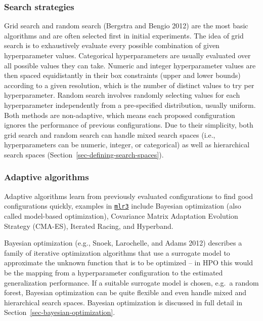 \hypertarget{search-strategies}{%
\subsubsection*{Search strategies}\label{search-strategies}}

Grid search and random search (Bergstra and Bengio 2012) are the most
basic algorithms and are often selected first in initial experiments.
The idea of grid search is to exhaustively evaluate every possible
combination of given hyperparameter values. Categorical hyperparameters
are usually evaluated over all possible values they can take. Numeric
and integer hyperparameter values are then spaced equidistantly in their
box constraints (upper and lower bounds) according to a given
resolution, which is the number of distinct values to try per
hyperparameter. Random search involves randomly selecting values for
each hyperparameter independently from a pre-specified distribution,
usually uniform. Both methods are non-adaptive, which means each
proposed configuration ignores the performance of previous
configurations. Due to their simplicity, both grid search and random
search can handle mixed search spaces (i.e., hyperparameters can be
numeric, integer, or categorical) as well as hierarchical search spaces
(Section~\ref{sec-defining-search-spaces}).

\hypertarget{adaptive-algorithms}{%
\subsubsection*{Adaptive algorithms}\label{adaptive-algorithms}}

Adaptive algorithms learn from previously evaluated configurations to
find good configurations quickly, examples in
\href{https://mlr3.mlr-org.com}{\texttt{mlr3}}
include Bayesian optimization (also called model-based optimization),
Covariance Matrix Adaptation Evolution Strategy (CMA-ES), Iterated
Racing, and Hyperband.

Bayesian optimization (e.g., Snoek,
Larochelle, and Adams 2012) describes a family of iterative optimization
algorithms that use a surrogate model to approximate the unknown
function that is to be optimized -- in HPO this would be the mapping
from a hyperparameter configuration to the estimated generalization
performance. If a suitable surrogate model is chosen, e.g.~a random
forest, Bayesian optimization can be quite flexible and even handle
mixed and hierarchical search spaces. Bayesian optimization is discussed
in full detail in Section~\ref{sec-bayesian-optimization}.

